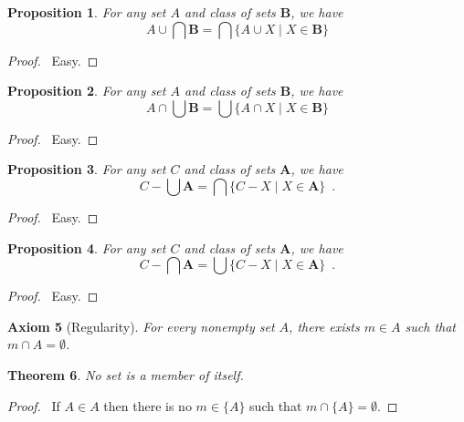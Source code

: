 \documentclass{article}
\let\qed\relax
\newtheorem{axiom}{Axiom}
\newtheorem{proposition}[axiom]{Proposition}
\newtheorem{theorem}[axiom]{Theorem}
\theoremstyle{definition}
\begin{document}
    \begin{proposition}
        For any set $A$ and class of sets $\mathbf{B}$, we have
        \[ A \cup \bigcap \mathbf{B} = \bigcap \{ A \cup X \mid X \in \mathbf{B} \} \]
    \end{proposition}

    \begin{proof}
        \pf\ Easy. \qed
    \end{proof}

    \begin{proposition}
        For any set $A$ and class of sets $\mathbf{B}$, we have
        \[ A \cap \bigcup \mathbf{B} = \bigcup \{ A \cap X \mid X \in \mathbf{B} \} \]
    \end{proposition}

    \begin{proof}
        \pf\ Easy. \qed
    \end{proof}

    \begin{proposition}
        For any set $C$ and class of sets $\mathbf{A}$, we have
        \[ C - \bigcup \mathbf{A} = \bigcap \{ C - X \mid X \in \mathbf{A} \} \enspace . \]
    \end{proposition}

    \begin{proof}
        \pf\ Easy. \qed
    \end{proof}

    \begin{proposition}
        For any set $C$ and class of sets $\mathbf{A}$, we have
        \[ C - \bigcap \mathbf{A} = \bigcup \{ C - X \mid X \in \mathbf{A} \} \enspace . \]
    \end{proposition}

    \begin{proof}
        \pf\ Easy. \qed
    \end{proof}

    \begin{axiom}[Regularity]
        For every nonempty set $A$, there exists $m \in A$ such that $m \cap A = \emptyset$.
    \end{axiom}

    \begin{theorem}
        No set is a member of itself.
    \end{theorem}

    \begin{proof}
        \pf\ If $A \in A$ then there is no $m \in \{A\}$ such that $m \cap \{A\} = \emptyset$. \qed
    \end{proof}
\end{document}
